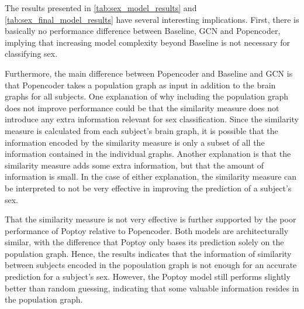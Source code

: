 The results presented in \ref{tab:sex_model_results} and \ref{tab:sex_final_model_results} have several interesting implications. First, there is basically no performance difference between Baseline, GCN and Popencoder, implying that increasing model complexity beyond Baseline is not necessary for classifying sex. 

Furthermore, the main difference between Popencoder and Baseline and GCN is that Popencoder takes a population graph as input in addition to the brain graphs for all subjects. One explanation of why including the population graph does not improve performance could be that the similarity measure does not introduce any extra information relevant for sex classification. Since the similarity measure is calculated from each subject's brain graph, it is possible that the information encoded by the similarity measure is only a subset of all the information contained in the individual graphs. Another explanation is that the similarity measure adds some extra information, but that the amount of information is small. In the case of either explanation, the similarity measure can be interpreted to not be very effective in improving the prediction of a subject's sex. 

That the similarity measure is not very effective is further supported by the poor performance of Poptoy relative to Popencoder. Both models are architecturally similar, with the difference that Poptoy only bases its prediction solely on the population graph. Hence, the results indicates that the information of similarity between subjects encoded in the popoulation graph is not enough for an accurate prediction for a subject's sex. However, the Poptoy model still performs slightly better than random guessing, indicating that some valuable information resides in the population graph. 



